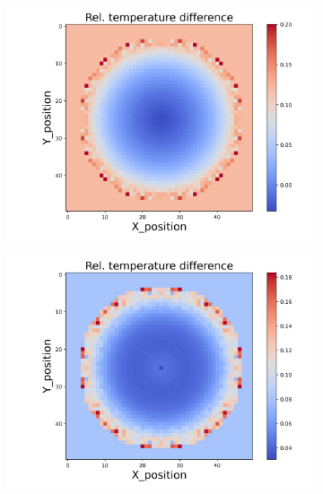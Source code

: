 \begin{figure}[h]
\begin{minipage}{\textwidth}
\begin{subfigure}{0.325\textwidth}
        \end{subfigure}
        \begin{subfigure}{0.325\textwidth}
            \centering
            \includegraphics[width=\textwidth]{figures/raw_data/23/lin_square/T_bias.jpg}
        \end{subfigure}
        \begin{subfigure}{0.325\textwidth}
            \centering
            \includegraphics[width=\textwidth]{figures/raw_data/24/lin_square/T_bias.jpg}
        \end{subfigure}
    \end{minipage}\\

\end{figure}
